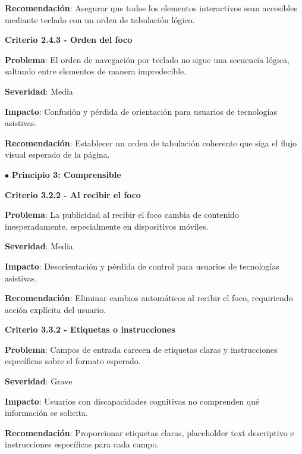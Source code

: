\documentclass{article}
\begin{document}
	\noindent
	\textbf{Recomendación}: Asegurar que todos los elementos interactivos sean accesibles mediante teclado con un orden de tabulación lógico.
	
	\vspace{0.5cm}
	
	\noindent
	\textbf{Criterio 2.4.3 - Orden del foco}
	
	\noindent
	\textbf{Problema}: El orden de navegación por teclado no sigue una secuencia lógica, saltando entre elementos de manera impredecible.
	
	\noindent
	\textbf{Severidad}: Media
	
	\noindent
	\textbf{Impacto}: Confusión y pérdida de orientación para usuarios de tecnologías asistivas.
	
	\noindent
	\textbf{Recomendación}: Establecer un orden de tabulación coherente que siga el flujo visual esperado de la página.

	\vspace{0.3cm}
	\noindent
	$\bullet$ \textbf{Principio 3: Comprensible}
	\vspace{0.3cm}
	
	\noindent
	\textbf{Criterio 3.2.2 - Al recibir el foco}
	
	\noindent
	\textbf{Problema}: La publicidad al recibir el foco cambia de contenido inesperadamente, especialmente en dispositivos móviles.
	
	\noindent
	\textbf{Severidad}: Media
	
	\noindent
	\textbf{Impacto}: Desorientación y pérdida de control para usuarios de tecnologías asistivas.
	
	\noindent
	\textbf{Recomendación}: Eliminar cambios automáticos al recibir el foco, requiriendo acción explícita del usuario.
	
	\vspace{0.5cm}
	
	\noindent
	\textbf{Criterio 3.3.2 - Etiquetas o instrucciones}
	
	\noindent
	\textbf{Problema}: Campos de entrada carecen de etiquetas claras y instrucciones específicas sobre el formato esperado.
	
	\noindent
	\textbf{Severidad}: Grave
	
	\noindent
	\textbf{Impacto}: Usuarios con discapacidades cognitivas no comprenden qué información se solicita.
	
	\noindent
	\textbf{Recomendación}: Proporcionar etiquetas claras, placeholder text descriptivo e instrucciones específicas para cada campo.
\end{document}
